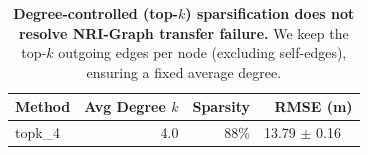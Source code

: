 \begin{table}[h]
\centering
\caption{\textbf{Degree-controlled (top-$k$) sparsification does not resolve NRI-Graph transfer failure.} We keep the top-$k$ outgoing edges per node (excluding self-edges), ensuring a fixed average degree.}
\label{tab:topk-sensitivity}
\begin{tabular}{lrrr}
\toprule
Method & Avg Degree $k$ & Sparsity & RMSE (m)\\
\midrule
topk_4 & 4.0 & 88\% & 13.79 $\pm$ 0.16 \
\bottomrule
\end{tabular}
\end{table}

